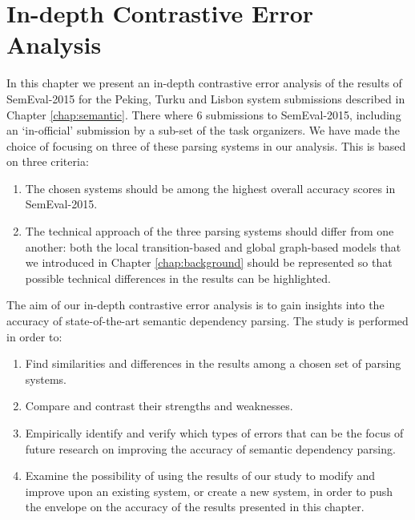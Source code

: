 \chapter{In-depth Contrastive Error Analysis}
\label{chap:analysis}



In this chapter we present an in-depth contrastive error analysis of the results of SemEval-2015 for the Peking, Turku and Lisbon system submissions described in Chapter \ref{chap:semantic}. There where 6 submissions to SemEval-2015, including an `in-official' submission by a sub-set of the task organizers. We have made the choice of focusing on three of these parsing systems in our analysis. This is based on three criteria:

\begin{enumerate}
    \item The chosen systems should be among the highest overall accuracy scores in SemEval-2015.
    \item The technical approach of the three parsing systems should differ from one another: both the local transition-based and global graph-based models that we introduced in Chapter \ref{chap:background} should be represented so that possible technical differences in the results can be highlighted.
\end{enumerate}

The aim of our in-depth contrastive error analysis is to gain insights into the accuracy of state-of-the-art semantic dependency parsing. The study is performed in order to:

\begin{enumerate}
    \item Find similarities and differences in the results among a chosen set of parsing systems.
    \item Compare and contrast their strengths and weaknesses.
    \item Empirically identify and verify which types of errors that can be the focus of future research on improving the accuracy of semantic dependency parsing.
    \item Examine the possibility of using the results of our study to modify and improve upon an existing system, or create a new system, in order to push the envelope on the accuracy of the results presented in this chapter.
\end{enumerate}

